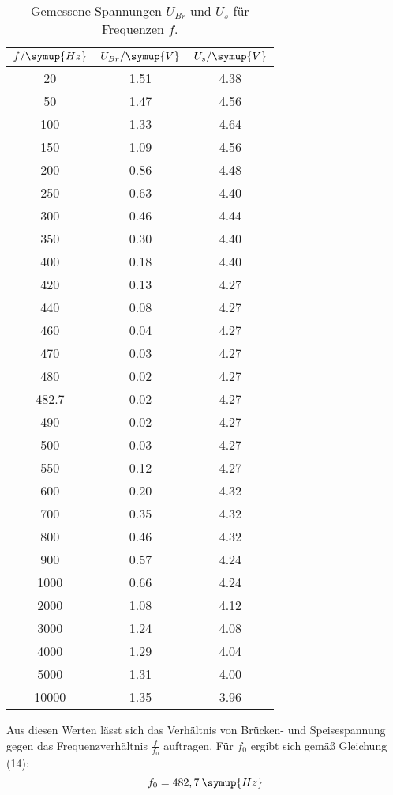 \begin{table}[H]
  \centering
  \caption{Gemessene Spannungen $U_{Br}$ und $U_s$ für Frequenzen $f$.}
  \label{tab:wien}
  \begin{tabular}{c c c}
    \toprule
     $f / \symup{Hz}$ & $U_{Br} / \symup{V}$ & $U_s / \symup{V}$ \\
    \midrule
    20	   &  1.51	   &  4.38   \\
    50	   &  1.47	   &  4.56\\
    100	   &  1.33     & 	4.64\\
    150	   &  1.09     & 	4.56\\
    200	   &  0.86     & 	4.48\\
    250	   &  0.63     & 	4.40\\
    300	   &  0.46     & 	4.44\\
    350	   &  0.30     & 	4.40\\
    400	   &  0.18     & 	4.40\\
    420	   &  0.13     & 	4.27\\
    440	   &  0.08     & 	4.27\\
    460	   &  0.04     & 	4.27\\
    470	   &  0.03     & 	4.27\\
    480	   &  0.02     & 	4.27\\
    482.7  & 	0.02     & 	4.27\\
    490	   &  0.02     & 	4.27\\
    500	   &  0.03     & 	4.27\\
    550	   &  0.12     & 	4.27\\
    600	   &  0.20     & 	4.32\\
    700	   &  0.35     & 	4.32\\
    800	   &  0.46     & 	4.32\\
    900	   &  0.57     & 	4.24\\
    1000	 &  0.66	   &  4.24\\
    2000	 &  1.08	   &  4.12\\
    3000	 &  1.24	   &  4.08\\
    4000	 &  1.29	   &  4.04\\
    5000	 &  1.31	   &  4.00\\
    10000  & 	1.35     &  3.96\\
    \bottomrule
  \end{tabular}
\end{table}

Aus diesen Werten lässt sich das Verhältnis von Brücken- und Speisespannung gegen
das Frequenzverhältnis $\frac{f}{f_0}$ auftragen.
Für $f_0$ ergibt sich gemäß Gleichung (14):
\begin{equation*}
  f_0 = 482,7 \: \symup{Hz}
\end{equation*}

